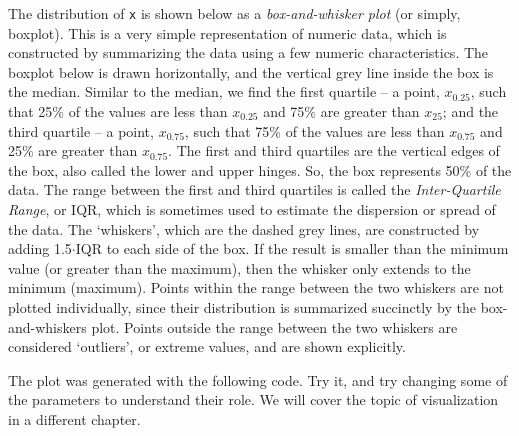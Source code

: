 The distribution of \texttt{x} is shown below as a \textit{box-and-whisker plot} (or simply, boxplot). This is a very simple representation of numeric data, which is constructed by summarizing the data using a few numeric characteristics. The boxplot below is drawn horizontally, and the vertical grey line inside the box is the median. Similar to the median, we find the first quartile -- a point, $x_{0.25}$, such that 25\% of the values are less than $x_{0.25}$ and 75\% are greater than $x_{25}$; and the third quartile -- a point, $x_{0.75}$, such that 75\% of the values are less than $x_{0.75}$ and 25\% are greater than $x_{0.75}$. The first and third quartiles are the vertical edges of the box, also called the lower and upper hinges. So, the box represents 50\% of the data. The range between the first and third quartiles is called the \textit{Inter-Quartile Range}, or IQR, which is sometimes used to estimate the dispersion or spread of the data.
The `whiskers', which are the dashed grey lines, are constructed by adding 1.5$\cdot$IQR to each side of the box. If the result is smaller than the minimum value (or greater than the maximum), then the whisker only extends to the minimum (maximum). Points within the range between the two whiskers are not plotted individually, since their distribution is summarized succinctly by the box-and-whiskers plot. Points outside the range between the two whiskers are considered `outliers', or extreme values, and are shown explicitly. 

The plot was generated with the following code. Try it, and try changing some of the parameters to understand their role. We will cover the topic of visualization in a different chapter.

